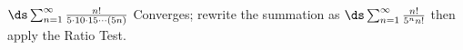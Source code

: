 {$\ds\sum_{n=1}^\infty \frac{n!}{5\cdot10\cdot15\cdots (5n)}$
}
{Converges; rewrite the summation as $\ds\sum_{n=1}^\infty \frac{n!}{5^nn!}$ then apply the Ratio Test.
}